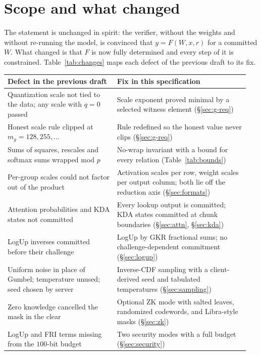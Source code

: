 \documentclass[11pt]{article}
\begin{document}
\tableofcontents

\section{Scope and what changed}
\label{sec:changes}

The statement is unchanged in spirit: the verifier, without the weights and without re-running the model, is convinced that \(y = F(W,x,r)\) for a committed \(W\).
What changed is that \(F\) is now fully determined and every step of it is constrained.
Table~\ref{tab:changes} maps each defect of the previous draft to its fix.

\begin{table}[h]
\centering\small
\begin{tabular}{@{}p{0.43\linewidth}p{0.52\linewidth}@{}}
\toprule
Defect in the previous draft & Fix in this specification \\
\midrule
Quantization scale not tied to the data; any scale with \(q=0\) passed & Scale exponent proved minimal by a selected witness element (\S\ref{sec:g-req}) \\
Honest scale rule clipped at \(m_g=128, 255, \ldots\) & Rule redefined so the honest value never clips (\S\ref{sec:g-req}) \\
Sums of squares, rescales and softmax sums wrapped mod \(p\) & No-wrap invariant with a bound for every relation (Table~\ref{tab:bounds}) \\
Per-group scales could not factor out of the product & Activation scales per row, weight scales per output column; both lie off the reduction axis (\S\ref{sec:formats}) \\
Attention probabilities and KDA states not committed & Every lookup output is committed; KDA states committed at chunk boundaries (\S\ref{sec:attn}, \S\ref{sec:kda}) \\
LogUp inverses committed before their challenge & LogUp by GKR fractional sums; no challenge-dependent commitment (\S\ref{sec:logup}) \\
Uniform noise in place of Gumbel; temperature unused; seed chosen by server & Inverse-CDF sampling with a client-derived seed and tabulated temperatures (\S\ref{sec:sampling}) \\
Zero knowledge cancelled the mask in the clear & Optional ZK mode with salted leaves, randomized codewords, and Libra-style masks (\S\ref{sec:zk}) \\
LogUp and FRI terms missing from the \(100\)-bit budget & Two security modes with a full budget (\S\ref{sec:security}) \\

\end{tabular}
\end{table}
\end{document}
